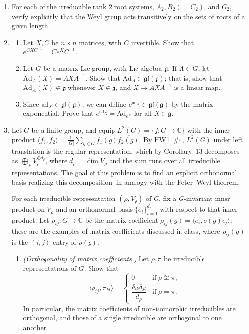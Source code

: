 \documentclass[12pt]{article}
\newcommand{\C}{\mathbb{C}}
\newcommand{\Ad}{\text{Ad}}
\newcommand{\ad}{\text{ad}}
\begin{document}
\begin{enumerate}
\item[2.] For each of the irreducible rank 2 root systems, $A_2, B_2(=C_2)$, and $G_2$, verify explicitly that the Weyl group acts transitively on the sets of roots of a given length.

\item[3.]
\begin{enumerate}
\item Let $X,C$ be $n\times n$ matrices, with $C$ invertible. Show that $e^{CXC^{-1}} = Ce^XC^{-1}$.
\item Let $G$ be a matrix Lie group, with Lie algebra $\mathfrak{g}$. If $A\in G$, let $\Ad_A(X)= AXA^{-1}$. Show that $\Ad_A\in\mathfrak{gl}(\mathfrak{g})$; that is, show that $\Ad_A(X)\in\mathfrak{g}$ whenever $X\in\mathfrak{g}$, and $X\mapsto AXA^{-1}$ is a linear map.
\item Since $\ad_X\in\mathfrak{gl}(\mathfrak{g})$, we can define $e^{\ad_X}\in\mathfrak{gl}(\mathfrak{g})$ by the matrix exponential. Prove that $e^{\ad_X}=\Ad_{e^X}$ for all $X\in\mathfrak{g}$.
\end{enumerate}

\item[4.] Let $G$ be a finite group, and equip $L^2(G) = \{f : G \to \C\}$ 
with the inner product $\langle f_1, f_2 \rangle = \frac{1}{|G|}\sum_{g \in G} 
f_1(g)\overline{f_2(g)}$. By HW1~\#4, $L^2(G)$ under left translation is the 
regular representation, which by Corollary~13 decomposes as 
$\bigoplus_\rho V_\rho^{\oplus d_\rho}$, where $d_\rho = \dim V_\rho$ and the 
sum runs over all irreducible representations. The goal of this problem is to 
find an explicit orthonormal basis realizing this decomposition, in analogy with 
the Peter--Weyl theorem.

For each irreducible representation $(\rho, V_\rho)$ of $G$, fix a $G$-invariant 
inner product on $V_\rho$ and an orthonormal basis $\{e_i\}_{i=1}^{d_\rho}$ with 
respect to that inner product. Let $\rho_{ij} : G \to \C$ be the matrix 
coefficient $\rho_{ij}(g) = \langle e_i, \rho(g)e_j\rangle$; these are the 
examples of matrix coefficients discussed in class, where $\rho_{ij}(g)$ is the 
$(i,j)$-entry of $\rho(g)$.

\begin{enumerate}
    \item \emph{(Orthogonality of matrix coefficients.)} Let $\rho, \pi$ be 
    irreducible representations of $G$. Show that
    \[
    \langle \rho_{ij}, \pi_{kl} \rangle = \begin{cases} 0 & \text{if } 
    \rho \not\cong \pi, \\ \dfrac{\delta_{ik}\delta_{jl}}{d_\rho} & \text{if } 
    \rho = \pi.\end{cases}
    \]
    In particular, the matrix coefficients of non-isomorphic irreducibles are 
    orthogonal, and those of a single irreducible are orthogonal to one another.


\end{enumerate}
\end{enumerate}
\end{document}
